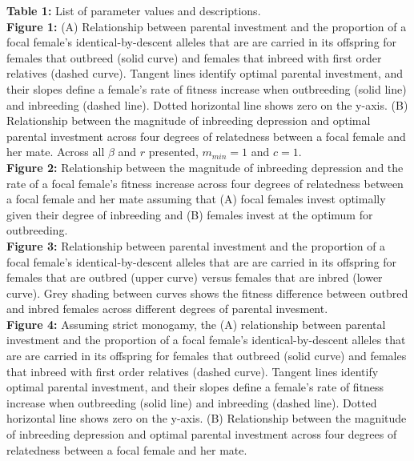 \documentclass[12pt]{article}
\begin{document}



\clearpage

\noindent \textbf{Table 1:}  List of parameter values and descriptions. \\

\noindent \textbf{Figure 1:} (A) Relationship between parental investment and the proportion of a focal female's identical-by-descent alleles that are are carried in its offspring for females that outbreed (solid curve) and females that inbreed with first order relatives (dashed curve). Tangent lines identify optimal parental investment, and their slopes define a female's rate of fitness increase when outbreeding (solid line) and inbreeding (dashed line). Dotted horizontal line shows zero on the y-axis. (B) Relationship between the magnitude of inbreeding depression and optimal parental investment across four degrees of relatedness between a focal female and her mate. Across all $\beta$ and $r$ presented, $m_{min}=1$ and $c=1$. \\ 

\noindent \textbf{Figure 2:} Relationship between the magnitude of inbreeding depression and the rate of a focal female's fitness increase across four degrees of relatedness between a focal female and her mate assuming that (A) focal females invest optimally given their degree of inbreeding and (B) females invest at the optimum for outbreeding. \\

\noindent \textbf{Figure 3:} Relationship between parental investment and the proportion of a focal female's identical-by-descent alleles that are are carried in its offspring for females that are outbred (upper curve) versus females that are inbred (lower curve). Grey shading between curves shows the fitness difference between outbred and inbred females across different degrees of parental invesment. \\

\noindent \textbf{Figure 4:} Assuming strict monogamy, the (A) relationship between parental investment and the proportion of a focal female's identical-by-descent alleles that are are carried in its offspring for females that outbreed (solid curve) and females that inbreed with first order relatives (dashed curve). Tangent lines identify optimal parental investment, and their slopes define a female's rate of fitness increase when outbreeding (solid line) and inbreeding (dashed line). Dotted horizontal line shows zero on the y-axis. (B) Relationship between the magnitude of inbreeding depression and optimal parental investment across four degrees of relatedness between a focal female and her mate. \\
\end{document}
